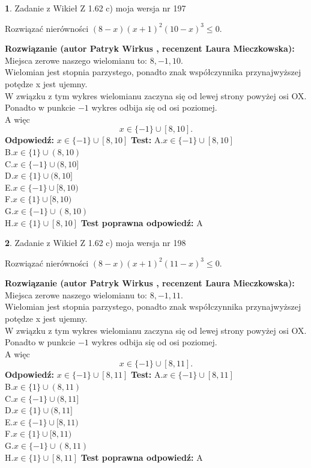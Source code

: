 \documentclass[12pt, a4paper]{article}
\theoremstyle{definition} %
\newtheorem{zad}{}
\newcommand{\zadStart}[1]{\begin{zad}#1\newline}
\newcommand{\zadStop}{\end{zad}}
\newcommand{\rozwStart}[2]{\noindent \textbf{Rozwiązanie (autor #1 , recenzent #2): }\newline}
\newcommand{\rozwStop}{\newline}
\newcommand{\odpStart}{\noindent \textbf{Odpowiedź:}\newline}
\newcommand{\odpStop}{\newline}
\newcommand{\testStart}{\noindent \textbf{Test:}\newline}
\newcommand{\testStop}{\newline}
\newcommand{\kluczStart}{\noindent \textbf{Test poprawna odpowiedź:}\newline}
\newcommand{\kluczStop}{\newline}
\begin{document}
\zadStart{Zadanie z Wikieł Z 1.62 c) moja wersja nr 197}

Rozwiązać nierówności $(8-x)(x+1)^{2}(10-x)^{3}\le0$.
\zadStop
\rozwStart{Patryk Wirkus}{Laura Mieczkowska}
Miejsca zerowe naszego wielomianu to: $8, -1, 10$.\\
Wielomian jest stopnia parzystego, ponadto znak współczynnika przy\linebreak najwyższej potędze x jest ujemny.\\ W związku z tym wykres wielomianu zaczyna się od lewej strony powyżej osi OX.\\
Ponadto w punkcie $-1$ wykres odbija się od osi poziomej.\\
A więc $$x \in \{-1\} \cup [8,10].$$
\rozwStop
\odpStart
$x \in \{-1\} \cup [8,10]$
\odpStop
\testStart
A.$x \in \{-1\} \cup [8,10]$\\
B.$x \in \{1\} \cup (8,10)$\\
C.$x \in \{-1\} \cup (8,10]$\\
D.$x \in \{1\} \cup (8,10]$\\
E.$x \in \{-1\} \cup [8,10)$\\
F.$x \in \{1\} \cup [8,10)$\\
G.$x \in \{-1\} \cup (8,10)$\\
H.$x \in \{1\} \cup [8,10]$
\testStop
\kluczStart
A
\kluczStop



\zadStart{Zadanie z Wikieł Z 1.62 c) moja wersja nr 198}

Rozwiązać nierówności $(8-x)(x+1)^{2}(11-x)^{3}\le0$.
\zadStop
\rozwStart{Patryk Wirkus}{Laura Mieczkowska}
Miejsca zerowe naszego wielomianu to: $8, -1, 11$.\\
Wielomian jest stopnia parzystego, ponadto znak współczynnika przy\linebreak najwyższej potędze x jest ujemny.\\ W związku z tym wykres wielomianu zaczyna się od lewej strony powyżej osi OX.\\
Ponadto w punkcie $-1$ wykres odbija się od osi poziomej.\\
A więc $$x \in \{-1\} \cup [8,11].$$
\rozwStop
\odpStart
$x \in \{-1\} \cup [8,11]$
\odpStop
\testStart
A.$x \in \{-1\} \cup [8,11]$\\
B.$x \in \{1\} \cup (8,11)$\\
C.$x \in \{-1\} \cup (8,11]$\\
D.$x \in \{1\} \cup (8,11]$\\
E.$x \in \{-1\} \cup [8,11)$\\
F.$x \in \{1\} \cup [8,11)$\\
G.$x \in \{-1\} \cup (8,11)$\\
H.$x \in \{1\} \cup [8,11]$
\testStop
\kluczStart
A
\kluczStop
\end{document}
